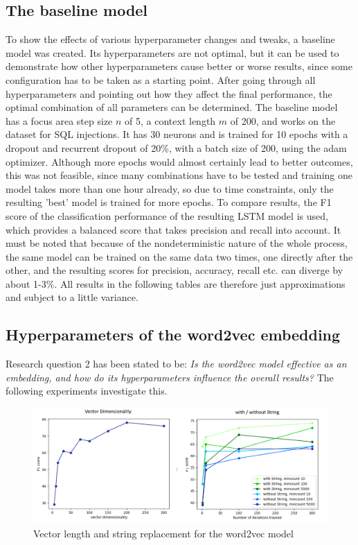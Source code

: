 \documentclass[
a4paper,
pagesize,
pdftex,
12pt,
ngerman,
fleqn,
final,
]{scrartcl}
\begin{document}
	
	\subsection{The baseline model}\label{baseline}
	To show the effects of various hyperparameter changes and tweaks, a baseline model was created. Its hyperparameters are not optimal, but it can be used to demonstrate how other hyperparameters cause better or worse results, since some configuration has to be taken as a starting point. After going through all hyperparameters and pointing out how they affect the final performance, the optimal combination of all parameters can be determined. The baseline model has a focus area step size $n$ of 5, a context length $m$ of 200, and works on the dataset for SQL injections. It has 30 neurons and is trained for 10 epochs with a dropout and recurrent dropout of 20\%, with a batch size of 200, using the adam optimizer. Although more epochs would almost certainly lead to better outcomes, this was not feasible, since many combinations have to be tested and training one model takes more than one hour already, so due to time constraints, only the resulting 'best' model is trained for more epochs. To compare results, the F1 score of the classification performance of the resulting LSTM  model is used, which provides a balanced score that takes precision and recall into account. It must be noted that because of the nondeterministic nature of the whole process, the same model can be trained on the same data two times, one directly after the other, and the resulting scores for precision, accuracy, recall etc. can diverge by about 1-3\%. All results in the following tables are therefore just approximations and subject to a little variance. 
	
	\subsection{Hyperparameters of the word2vec embedding}
	
	Research question 2 has been stated to be: \textit{Is the word2vec model effective as an embedding, and how do its hyperparameters influence the overall results?} The following experiments investigate this. 
	
	\begin{figure}[h]
		\centering
		\includegraphics[width=1\textwidth]{img/word2vecHyper2}
		\caption{Vector length and string replacement for the word2vec model}
		\label{fig:w2vhyper2}
	\end{figure}
	
\end{document}
